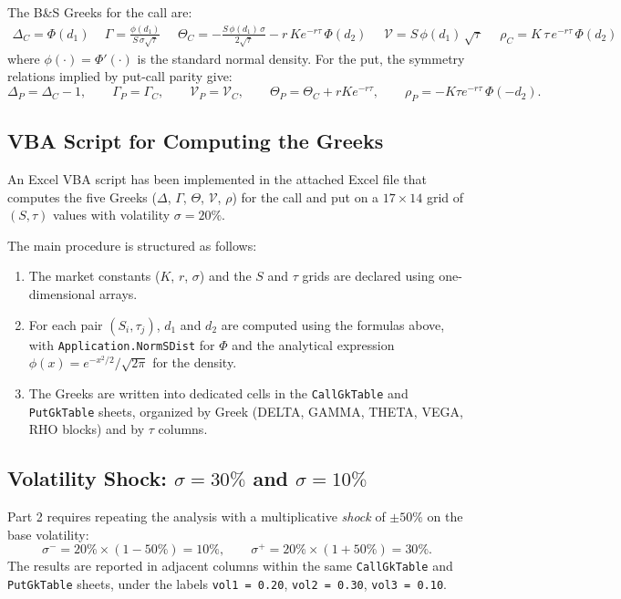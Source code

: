 \documentclass{report}
\begin{document}
The B\&S Greeks for the call are:
\begin{align*}
  \Delta_C = \Phi(d_1) \quad\, \Gamma = \frac{\phi(d_1)}{S\,\sigma\sqrt{\tau}} \quad\,\,
  \Theta_C = -\frac{S\,\phi(d_1)\,\sigma}{2\sqrt{\tau}}
              - r\,K e^{-r\tau}\,\Phi(d_2) \quad\,\,
  \mathcal{V} = S\,\phi(d_1)\,\sqrt{\tau} \quad\,\,
  \rho_C   = K\,\tau\,e^{-r\tau}\,\Phi(d_2)
\end{align*}
where $\phi(\cdot) = \Phi'(\cdot)$ is the standard normal density.
For the put, the symmetry relations implied by put-call parity give:
\[
  \Delta_P = \Delta_C - 1, \qquad
  \Gamma_P = \Gamma_C, \qquad
  \mathcal{V}_P = \mathcal{V}_C, \qquad
  \Theta_P = \Theta_C + r K e^{-r\tau}, \qquad
  \rho_P = -K\tau e^{-r\tau}\,\Phi(-d_2).
\]
 
\subsection{VBA Script for Computing the Greeks}
 
An Excel VBA script has been implemented in the attached Excel file that computes the five Greeks ($\Delta$,
$\Gamma$, $\Theta$, $\mathcal{V}$, $\rho$) for the call and put on a $17 \times 14$
grid of $(S, \tau)$ values with volatility $\sigma = 20\%$.
 
The main procedure is structured as follows:
\begin{enumerate}
  \item The market constants ($K$, $r$, $\sigma$) and the $S$ and $\tau$ grids are
        declared using one-dimensional arrays.
  \item For each pair $(S_i, \tau_j)$, $d_1$ and $d_2$ are computed using the
        formulas above, with \texttt{Application.NormSDist} for $\Phi$ and the
        analytical expression $\phi(x) = e^{-x^2/2}/\sqrt{2\pi}$ for the density.
  \item The Greeks are written into dedicated cells in the \texttt{CallGkTable} and
        \texttt{PutGkTable} sheets, organized by Greek (DELTA, GAMMA, THETA, VEGA, RHO
        blocks) and by $\tau$ columns.
\end{enumerate}
 
\subsection{Volatility Shock: $\sigma = 30\%$ and $\sigma = 10\%$}
 
Part 2 requires repeating the analysis with a multiplicative \emph{shock} of
$\pm 50\%$ on the base volatility:
\[
  \sigma^- = 20\% \times (1 - 50\%) = 10\%, \qquad
  \sigma^+ = 20\% \times (1 + 50\%) = 30\%.
\]
The results are reported in adjacent columns within the same \texttt{CallGkTable} and
\texttt{PutGkTable} sheets, under the labels \texttt{vol1 = 0.20}, \texttt{vol2 = 0.30},
\texttt{vol3 = 0.10}.
 
\end{document}
